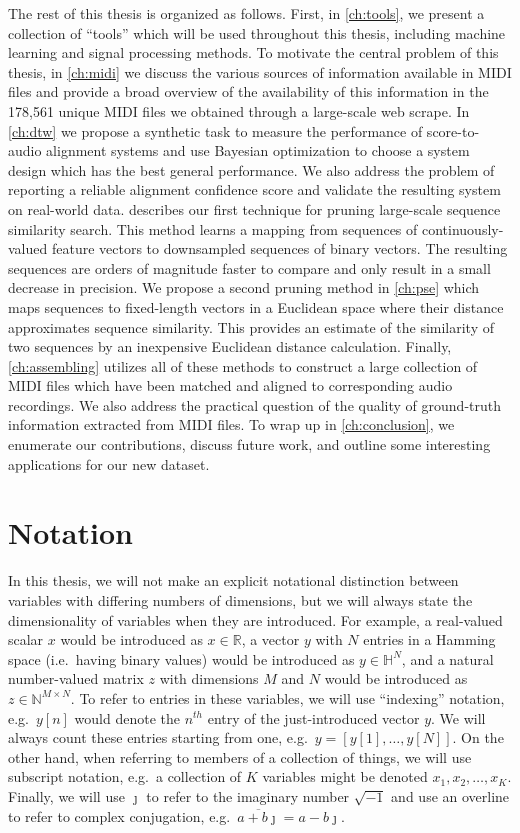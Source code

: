The rest of this thesis is organized as follows.
First, in \cref{ch:tools}, we present a collection of ``tools'' which will be used throughout this thesis, including machine learning and signal processing methods.
To motivate the central problem of this thesis, in \cref{ch:midi} we discuss the various sources of information available in MIDI files and provide a broad overview of the availability of this information in the 178,561 unique MIDI files we obtained through a large-scale web scrape.
In \cref{ch:dtw} we propose a synthetic task to measure the performance of score-to-audio alignment systems and use Bayesian optimization to choose a system design which has the best general performance.
We also address the problem of reporting a reliable alignment confidence score and validate the resulting system on real-world data.
 describes our first technique for pruning large-scale sequence similarity search.
This method learns a mapping from sequences of continuously-valued feature vectors to downsampled sequences of binary vectors.
The resulting sequences are orders of magnitude faster to compare and only result in a small decrease in precision.
We propose a second pruning method in \cref{ch:pse} which maps sequences to fixed-length vectors in a Euclidean space where their distance approximates sequence similarity.
This provides an estimate of the similarity of two sequences by an inexpensive Euclidean distance calculation.
Finally, \cref{ch:assembling} utilizes all of these methods to construct a large collection of MIDI files which have been matched and aligned to corresponding audio recordings.
We also address the practical question of the quality of ground-truth information extracted from MIDI files.
To wrap up in \cref{ch:conclusion}, we enumerate our contributions, discuss future work, and outline some interesting applications for our new dataset.

\section{Notation}

In this thesis, we will not make an explicit notational distinction between variables with differing numbers of dimensions, but we will always state the dimensionality of variables when they are introduced.
For example, a real-valued scalar $x$ would be introduced as $x \in \mathbb{R}$, a vector $y$ with $N$ entries in a Hamming space (i.e.\ having binary values) would be introduced as $y \in \mathbb{H}^N$, and a natural number-valued matrix $z$ with dimensions $M$ and $N$ would be introduced as $z \in \mathbb{N}^{M \times N}$.
To refer to entries in these variables, we will use ``indexing'' notation, e.g.\ $y[n]$ would denote the $n^{th}$ entry of the just-introduced vector $y$.
We will always count these entries starting from one, e.g.\ $y = [y[1], \ldots, y[N]]$.
On the other hand, when referring to members of a collection of things, we will use subscript notation, e.g.\ a collection of $K$ variables might be denoted $x_1, x_2, \ldots, x_K$.
Finally, we will use $\jmath$ to refer to the imaginary number $\sqrt{-1}$ and use an overline to refer to complex conjugation, e.g.\ $\overline{a + b\jmath} = a - b\jmath$.

